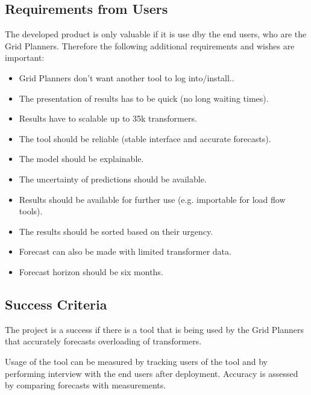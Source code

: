 \documentclass[letterpaper,10pt,english]{sphinxmanual}
\begin{document}
\subsection{Requirements from Users}
\label{\detokenize{business_understanding:requirements-from-users}}
The developed product is only valuable if it is use dby the end users, who are the Grid Planners.
Therefore the following additional requirements and wishes are important:
\begin{itemize}
\item {} 
Grid Planners don’t want another tool to log into/install..

\item {} 
The presentation of results has to be quick (no long waiting times).

\item {} 
Results have to scalable up to 35k transformers.

\item {} 
The tool should be reliable (stable interface and accurate forecasts).

\item {} 
The model should be explainable.

\item {} 
The uncertainty of predictions should be available.

\item {} 
Results should be available for further use (e.g. importable for load flow tools).

\item {} 
The results should be sorted based on their urgency.

\item {} 
Forecast can also be made with limited transformer data.

\item {} 
Forecast horizon should be six months.

\end{itemize}


\subsection{Success Criteria}
\label{\detokenize{business_understanding:success-criteria}}
The project is a success if there is a tool that is being used by the Grid Planners that accurately forecasts overloading of transformers.

Usage of the tool can be measured by tracking users of the tool and by performing interview with the end users after deployment.
Accuracy is assessed by comparing forecasts with measurements.
\end{document}
